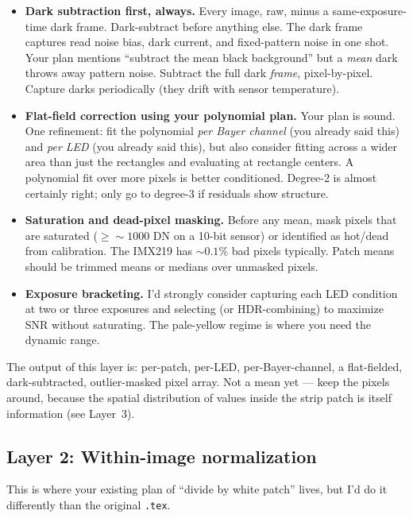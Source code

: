 \documentclass[11pt,letterpaper]{article}
\begin{document}
\begin{itemize}
  \item \textbf{Dark subtraction first, always.} Every image, raw, minus a
    same-exposure-time dark frame. Dark-subtract before anything else. The
    dark frame captures read noise bias, dark current, and fixed-pattern
    noise in one shot. Your plan mentions ``subtract the mean black
    background'' but a \emph{mean} dark throws away pattern noise. Subtract
    the full dark \emph{frame}, pixel-by-pixel. Capture darks periodically
    (they drift with sensor temperature).
  \item \textbf{Flat-field correction using your polynomial plan.} Your
    plan is sound. One refinement: fit the polynomial \emph{per Bayer
    channel} (you already said this) and \emph{per LED} (you already said
    this), but also consider fitting across a wider area than just the
    rectangles and evaluating at rectangle centers. A polynomial fit over
    more pixels is better conditioned. Degree-2 is almost certainly right;
    only go to degree-3 if residuals show structure.
  \item \textbf{Saturation and dead-pixel masking.} Before any mean, mask
    pixels that are saturated ($\geq {\sim}1000$ DN on a 10-bit sensor) or
    identified as hot/dead from calibration. The IMX219 has ${\sim}0.1\%$
    bad pixels typically. Patch means should be trimmed means or medians
    over unmasked pixels.
  \item \textbf{Exposure bracketing.} I'd strongly consider capturing each
    LED condition at two or three exposures and selecting (or HDR-combining)
    to maximize SNR without saturating. The pale-yellow regime is where you
    need the dynamic range.
\end{itemize}

The output of this layer is: per-patch, per-LED, per-Bayer-channel, a
flat-fielded, dark-subtracted, outlier-masked pixel array. Not a mean yet
--- keep the pixels around, because the spatial distribution of values
inside the strip patch is itself information (see Layer~3).

\subsection*{Layer 2: Within-image normalization}

This is where your existing plan of ``divide by white patch'' lives, but I'd
do it differently than the original \texttt{.tex}.
\end{document}
